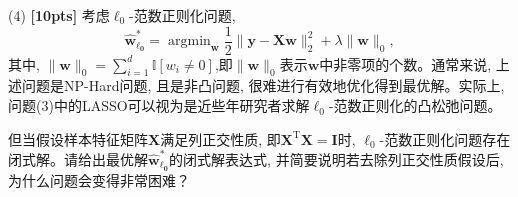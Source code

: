 \documentclass[a4paper,UTF8]{article}
\numberwithin{equation}{section}
\theoremstyle{definition}
\begin{document}
(4) \textbf{[10pts]} 考虑$\ell_0$-范数正则化问题, 
\begin{equation}
\label{eq:ls-l0}
\hat{\mathbf{w}}_{\mathbf{\ell_0}}^* = \mathop{\arg\min}_{\mathbf{w}} \frac{1}{2}\lVert \mathbf{y} - \mathbf X \mathbf{w} \rVert_2^2 +\lambda \lVert \mathbf{w}\rVert_0,
\end{equation}
其中, $\lVert \mathbf{w}\rVert_0=\sum_{i=1}^d \mathbb{I}[w_i \neq 0]$,即$\lVert \mathbf{w}\rVert_0$表示$\mathbf{w}$中非零项的个数。通常来说, 上述问题是NP-Hard问题, 且是非凸问题, 很难进行有效地优化得到最优解。实际上, 问题(3)中的LASSO可以视为是近些年研究者求解$\ell_0$-范数正则化的凸松弛问题。

但当假设样本特征矩阵$\mathbf{X}$满足列正交性质, 即$\mathbf{X}^\mathrm{T}\mathbf{X} = \mathbf{I}$时, $\ell_0$-范数正则化问题存在闭式解。请给出最优解$\hat{\mathbf{w}}_{\mathbf{\ell_0}}^*$的闭式解表达式, 并简要说明若去除列正交性质假设后, 为什么问题会变得非常困难？
\end{document}
